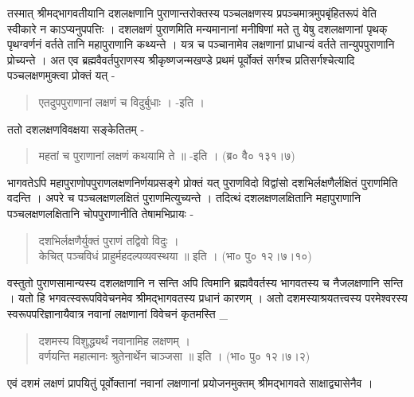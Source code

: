 तस्मात् श्रीमद्भागवतीयानि दशलक्षणानि पुराणान्तरोक्तस्य पञ्चलक्षणस्य प्रपञ्चमात्रमुपबृंहितरूपं वेति स्वीकारे न काऽप्यनुपपत्तिः । दशलक्षणं पुराणमिति मन्यमानानां मनीषिणां मते तु येषु दशलक्षणानां पृथक् पृथग्वर्णनं वर्तते तानि महापुराणानि कथ्यन्ते । यत्र च पञ्चानामेव लक्षणानां प्राधान्यं वर्तते तान्युपपुराणानि प्रोच्यन्ते । अत एव ब्रह्मवैवर्तपुराणस्य श्रीकृष्णजन्मखण्डे प्रथमं पूर्वोक्तं सर्गश्च प्रतिसर्गश्चेत्यादि पञ्चलक्षणमुक्त्वा प्रोक्तं यत् -
\begin{verse}
एतदुपपुराणानां लक्षणं च विदुर्बुधाः । -इति ।
\end{verse}
ततो दशलक्षणविवक्षया सङ्केतितम् -
\begin{verse}
महतां च पुराणानां लक्षणं कथयामि ते ॥ -इति । (ब्र० वै० १३१।७)
\end{verse}
भागवतेऽपि महापुराणोपपुराणलक्षणनिर्णयप्रसङ्गे प्रोक्तं यत् पुराणविदो विद्वांसो दशभिर्लक्षणैर्लक्षितं पुराणमिति वदन्ति । अपरे च पञ्चलक्षणलक्षितं पुराणमित्युच्यन्ते । तदित्थं दशलक्षणलक्षितानि महापुराणानि पञ्चलक्षणलक्षितानि चोपपुराणानीति तेषामभिप्रायः -
\begin{verse}
दशभिर्लक्षणैर्युक्तं पुराणं तद्विवो विदुः ।\\
केचित् पञ्चविधं प्राहुर्महदल्पव्यवस्थया ॥ इति । (भा० पु० १२।७।१०)
\end{verse}
वस्तुतो पुराणसामान्यस्य दशलक्षणानि न सन्ति अपि त्विमानि ब्रह्मवैवर्तस्य भागवतस्य च नैजलक्षणानि सन्ति । यतो हि भगवत्स्वरूपविवेचनमेव श्रीमद्भागवतस्य प्रधानं कारणम् । अतो दशमस्याश्रयतत्त्वस्य परमेश्वरस्य स्वरूपपरिज्ञानायैवात्र नवानां लक्षणानां विवेचनं कृतमस्ति _
\begin{verse}
दशमस्य विशुद्ध्यर्थं नवानामिह लक्षणम् ।\\
वर्णयन्ति महात्मानः श्रुतेनार्थेन चाञ्जसा ॥ इति । (भा० पु० १२।७।२)
\end{verse}
एवं दशमं लक्षणं प्रापयितुं पूर्वोक्तानां नवानां लक्षणानां प्रयोजनमुक्तम् श्रीमद्भागवते साक्षाद्व्यासेनैव ।
